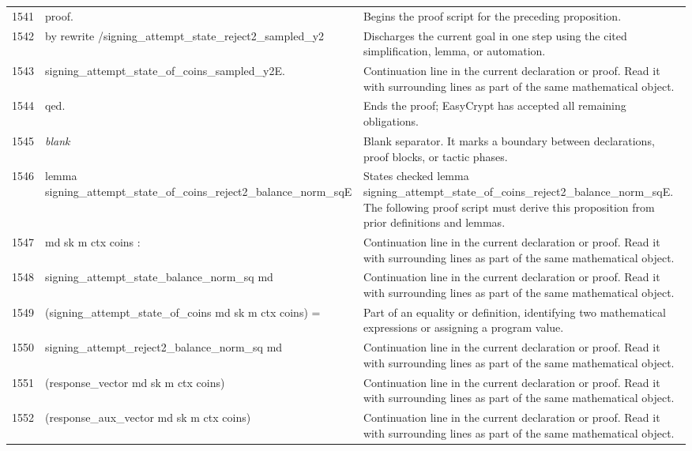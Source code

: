 \documentclass[10pt]{article}
\begin{document}
\begin{longtable}{r L{0.53\textwidth} L{0.37\textwidth}}
1541 & {\ttfamily\scriptsize proof.} & Begins the proof script for the preceding proposition. \\
1542 & {\ttfamily\scriptsize by rewrite /signing\_attempt\_state\_reject2\_sampled\_y2} & Discharges the current goal in one step using the cited simplification, lemma, or automation. \\
1543 & {\ttfamily\scriptsize            signing\_attempt\_state\_of\_coins\_sampled\_y2E.} & Continuation line in the current declaration or proof.  Read it with surrounding lines as part of the same mathematical object. \\
1544 & {\ttfamily\scriptsize qed.} & Ends the proof; EasyCrypt has accepted all remaining obligations. \\
1545 & {\ttfamily\scriptsize \emph{blank}} & Blank separator.  It marks a boundary between declarations, proof blocks, or tactic phases. \\
1546 & {\ttfamily\scriptsize lemma signing\_attempt\_state\_of\_coins\_reject2\_balance\_norm\_sqE} & States checked lemma signing\_attempt\_state\_of\_coins\_reject2\_balance\_norm\_sqE.  The following proof script must derive this proposition from prior definitions and lemmas. \\
1547 & {\ttfamily\scriptsize    md sk m ctx coins :} & Continuation line in the current declaration or proof.  Read it with surrounding lines as part of the same mathematical object. \\
1548 & {\ttfamily\scriptsize   signing\_attempt\_state\_balance\_norm\_sq md} & Continuation line in the current declaration or proof.  Read it with surrounding lines as part of the same mathematical object. \\
1549 & {\ttfamily\scriptsize     (signing\_attempt\_state\_of\_coins md sk m ctx coins) =} & Part of an equality or definition, identifying two mathematical expressions or assigning a program value. \\
1550 & {\ttfamily\scriptsize   signing\_attempt\_reject2\_balance\_norm\_sq md} & Continuation line in the current declaration or proof.  Read it with surrounding lines as part of the same mathematical object. \\
1551 & {\ttfamily\scriptsize     (response\_vector md sk m ctx coins)} & Continuation line in the current declaration or proof.  Read it with surrounding lines as part of the same mathematical object. \\
1552 & {\ttfamily\scriptsize     (response\_aux\_vector md sk m ctx coins)} & Continuation line in the current declaration or proof.  Read it with surrounding lines as part of the same mathematical object. \\

\end{longtable}
\end{document}
